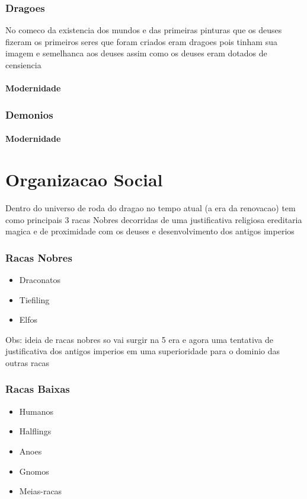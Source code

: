 \documentclass{book}
\begin{document}
\section{Dragoes}
No comeco da existencia dos mundos e das primeiras pinturas que os deuses fizeram os primeiros 
seres que foram criados eram dragoes pois tinham sua imagem e semelhanca aos deuses assim como
os deuses eram dotados de censiencia 
\subsection*{Modernidade}

\section{Demonios} 
\subsection*{Modernidade}

\part{Organizacao Social}

Dentro do universo de roda do dragao no tempo atual (a era da renovacao) tem como principais 3 
racas Nobres decorridas de uma justificativa religiosa ereditaria magica e de proximidade com
os deuses e desenvolvimento dos antigos imperios

\section*{Racas Nobres}
\begin{itemize}
    \item Draconatos
    \item Tiefiling
    \item Elfos
\end{itemize}
Obs: ideia de racas nobres so vai surgir na 5 era e agora 
uma tentativa de justificativa dos antigos imperios em uma superioridade para o dominio das 
outras racas 

\section*{Racas Baixas}
\begin{itemize}
    \item Humanos
    \item Halflings
    \item Anoes
    \item Gnomos
    \item Meias-racas
\end{itemize}
\end{document}
